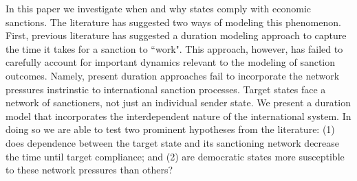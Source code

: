 In this paper we investigate when and why states comply with economic sanctions.  The literature has suggested two ways of modeling this phenomenon. First, previous literature has suggested a duration modeling approach to capture the time it takes for a sanction to ``work". This approach, however, has failed to carefully account for important dynamics relevant to the modeling of sanction outcomes. Namely, present duration approaches fail to incorporate the network pressures instrinstic to international sanction processes. Target states face a network of sanctioners, not just an individual sender state. We present a duration model that incorporates the interdependent nature of the international system. In doing so we are able to test two prominent hypotheses from the literature: (1) does dependence between the target state and its sanctioning network decrease the time until target compliance; and (2) are democratic states more susceptible to these network pressures than others?